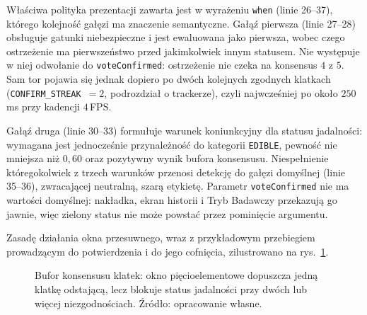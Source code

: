 Właściwa polityka prezentacji zawarta jest w wyrażeniu \texttt{when} (linie 26--37), którego kolejność gałęzi ma znaczenie semantyczne. Gałąź pierwsza (linie 27--28) obsługuje gatunki niebezpieczne i jest ewaluowana jako pierwsza, wobec czego ostrzeżenie ma pierwszeństwo przed jakimkolwiek innym statusem. Nie występuje w niej odwołanie do \texttt{voteConfirmed}: ostrzeżenie nie czeka na konsensus $4$ z $5$. Sam tor pojawia się jednak dopiero po dwóch kolejnych zgodnych klatkach (\texttt{CONFIRM\_STREAK}~$=2$, podrozdział o trackerze), czyli najwcześniej po około $250$\,ms przy kadencji $4$\,FPS.

Gałąź druga (linie 30--33) formułuje warunek koniunkcyjny dla statusu jadalności: wymagana jest jednocześnie przynależność do kategorii \texttt{EDIBLE}, pewność nie mniejsza niż $0{,}60$ oraz pozytywny wynik bufora konsensusu. Niespełnienie któregokolwiek z trzech warunków przenosi detekcję do gałęzi domyślnej (linie 35--36), zwracającej neutralną, szarą etykietę. Parametr \texttt{voteConfirmed} nie ma wartości domyślnej: nakładka, ekran historii i Tryb Badawczy przekazują go jawnie, więc zielony status nie może powstać przez pominięcie argumentu.

Zasadę działania okna przesuwnego, wraz z przykładowym przebiegiem prowadzącym do potwierdzenia i do jego cofnięcia, zilustrowano na rys.~\ref{fig:bufor_konsensusu}.

\begin{figure}[htbp]
 \centering
 \caption{Bufor konsensusu klatek: okno pięcioelementowe dopuszcza jedną klatkę odstającą, lecz blokuje status jadalności przy dwóch lub więcej niezgodnościach. Źródło: opracowanie własne.}
 \label{fig:bufor_konsensusu}
\end{figure}

